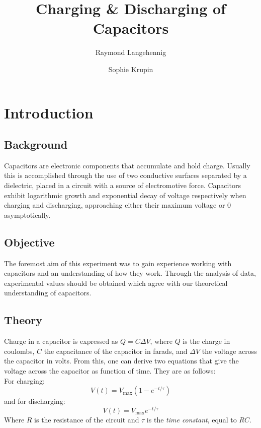 \documentclass{report}
\title{Charging \& Discharging of Capacitors}
\author{Raymond Langehennig \and Sophie Krupin}
\begin{document}
\maketitle

\section{Introduction}
	\subsection{Background}
	Capacitors are electronic components that accumulate and hold charge.
	Usually this is accomplished through the use of two conductive surfaces separated by a dielectric, placed in a circuit with a source of electromotive force.
	Capacitors exhibit logarithmic growth and exponential decay of voltage respectively when charging and discharging, approaching either their maximum voltage or 0 asymptotically.
	
	\subsection{Objective}
	The foremost aim of this experiment was to gain experience working with capacitors and an understanding of how they work.
	Through the analysis of data, experimental values should be obtained which agree with our theoretical understanding of capacitors.
		
	\subsection{Theory}
	Charge in a capacitor is expressed as $Q = C\Delta V$, where $Q$ is the charge in coulombs, $C$ the capacitance of the capacitor in farads, and $\Delta V$ the voltage across the capacitor in volts.
	From this, one can derive two equations that give the voltage across the capacitor as function of time.	They are as follows:\\
	For charging:
	\[
	V(t) = V_\mathrm{max}(1-e^{-t/\tau})
	\]
	and for discharging:
	\[
	V(t) = V_\mathrm{max}e^{-t/\tau}
	\]
	Where $R$ is the resistance of the circuit and $\tau$ is the \emph{time constant}, equal to $RC$.
	
	
	
\end{document}
